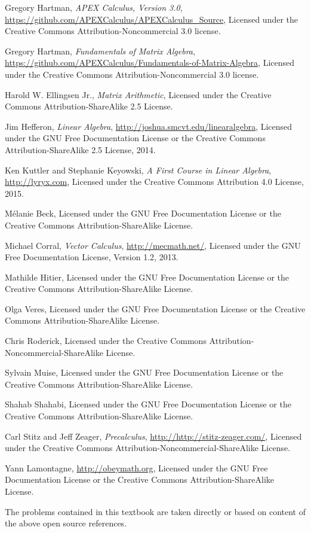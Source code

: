 \onecolumn


\begin{thebibliography}{9}
Gregory Hartman,
\emph{APEX Calculus, Version 3.0},
\url{https://github.com/APEXCalculus/APEXCalculus_Source},
Licensed under the
Creative Commons Attribution-Noncommercial 3.0 license.

Gregory Hartman,
\emph{Fundamentals of Matrix Algebra},
\url{https://github.com/APEXCalculus/Fundamentals-of-Matrix-Algebra},
Licensed under the 
Creative Commons Attribution-Noncommercial 3.0 license.

Harold W. Ellingsen Jr.,
\emph{Matrix Arithmetic},
Licensed under the
Creative Commons Attribution-ShareAlike 2.5 License.
 

Jim Hefferon,
\emph{Linear Algebra},
\url{http://joshua.smcvt.edu/linearalgebra},
Licensed under the GNU Free Documentation License or the 
Creative Commons Attribution-ShareAlike 2.5 License,
2014.

Ken Kuttler and Stephanie Keyowski,
\emph{A First Course in Linear Algebra},
\url{http://lyryx.com},
Licensed under the
Creative Commons Attribution 4.0 License,
2015.

M\'elanie Beck,
Licensed under the GNU Free Documentation License or the
Creative Commons Attribution-ShareAlike License.


Michael Corral,
\emph{Vector Calculus},
\url{http://mecmath.net/},
Licensed under the GNU Free Documentation License, Version 1.2, 2013.

Mathilde Hitier,
Licensed under the GNU Free Documentation License or the
Creative Commons Attribution-ShareAlike License.

Olga Veres,
Licensed under the GNU Free Documentation License or the
Creative Commons Attribution-ShareAlike License.

Chris Roderick,
Licensed under the
Creative Commons Attribution-Noncommercial-ShareAlike License.

Sylvain Muise,
Licensed under the GNU Free Documentation License or the
Creative Commons Attribution-ShareAlike License.

Shahab Shahabi,
Licensed under the GNU Free Documentation License or the
Creative Commons Attribution-ShareAlike License.

Carl Stitz and Jeff Zeager,
\emph{Precalculus},
\url{http://http://stitz-zeager.com/},
Licensed under the
Creative Commons Attribution-Noncommercial-ShareAlike License.

Yann Lamontagne,
\url{http://obeymath.org},
Licensed under the GNU Free Documentation License or the 
Creative Commons Attribution-ShareAlike License.

\end{thebibliography}
The problems contained in this textbook are taken directly or based on content of the above open source references.


